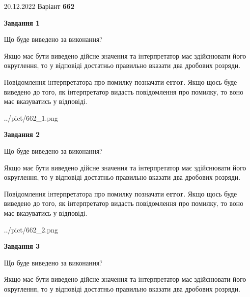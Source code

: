 \documentclass[12pt, ukrainian]{article}
\begin{document}
{20.12.2022 Варіант \No \textbf { 662 }\par}
{
\begin {Large}

{\begin {center}\textbf{Завдання 1}\end {center}}\par
Що буде виведено за виконання? \par

Якщо має бути виведено дійсне значення та інтерпретатор має здійснювати його округлення, 
то у відповіді достатньо правильно вказати два дробових розряди.

Повідомлення інтерпретатора про помилку позначати \textbf{error}.
Якщо щось буде виведено до того, як інтерпретатор видасть повідомлення про помилку, 
то воно має вказуватись у відповіді. \par

\begin{center}
	{../pict/662_1.png}
\end{center}
\newpage

{\begin {center}\textbf{Завдання 2}\end {center}}\par
Що буде виведено за виконання? \par

Якщо має бути виведено дійсне значення та інтерпретатор має здійснювати його округлення, 
то у відповіді достатньо правильно вказати два дробових розряди.

Повідомлення інтерпретатора про помилку позначати \textbf{error}.
Якщо щось буде виведено до того, як інтерпретатор видасть повідомлення про помилку, 
то воно має вказуватись у відповіді. \par

\begin{center}
	{../pict/662_2.png}
\end{center}
\newpage

{\begin {center}\textbf{Завдання 3}\end {center}}\par
Що буде виведено за виконання? \par

Якщо має бути виведено дійсне значення та інтерпретатор має здійснювати його округлення, 
то у відповіді достатньо правильно вказати два дробових розряди.


\end{Large}}
\end{document}
